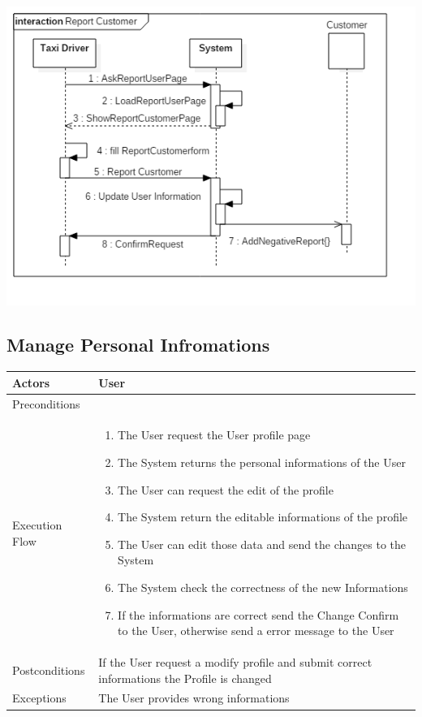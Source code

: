 \documentclass[english]{article}
\begin{document}
\includegraphics[width=\textwidth]{ReportUser}

\subsection{Manage Personal Infromations}

\begin{tabular}{lp{8cm}}
\hline
Actors & User \\
\hline
Preconditions & \\
\hline
Execution Flow &  
		\begin{enumerate}
			\item The User request the User profile page
			\item The System returns the personal informations of the User
			\item The User can request the edit of the profile
			\item The System return the editable informations of the profile
			\item The User can edit those data and send the changes to the System
			\item The System check the correctness of the new Informations
			\item If the informations are correct send the Change Confirm to the User, otherwise send a error message to the User
		\end{enumerate} 
	\\ 
\hline
Postconditions & If the User request a modify profile and submit correct informations the Profile is changed \\
\hline
Exceptions & The User provides wrong informations
\end{tabular}
\end{document}
